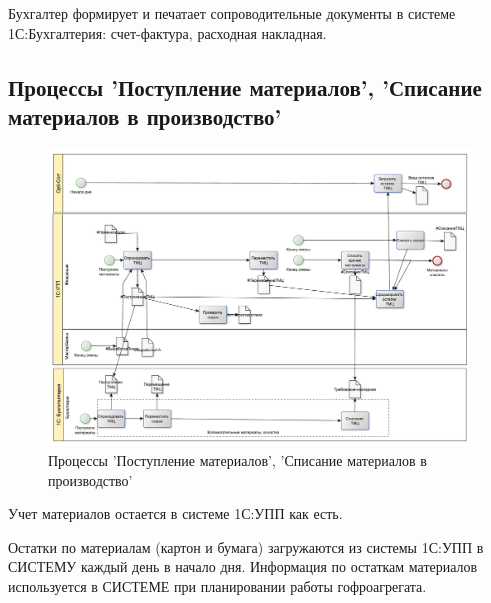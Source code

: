 Бухгалтер формирует и печатает сопроводительные документы в системе 1С:Бухгалтерия: счет-фактура, расходная накладная.



\subsection{Процессы 'Поступление материалов', 'Списание материалов в производство'}
%
\begin{figure}
\begin{center}
  \includegraphics[angle=90, height=0.8\textheight, keepaspectratio]{Pics/6_Учет ТМЦ.pdf}
\end{center}
  \caption{Процессы 'Поступление материалов', 'Списание материалов в производство'}
  \label{pic:Schema_6}
\end{figure}

Учет материалов остается в системе 1С:УПП как есть.

Остатки по материалам (картон и бумага) загружаются из системы 1С:УПП в СИСТЕМУ каждый день в начало дня. Информация по остаткам материалов используется в СИСТЕМЕ при планировании работы гофроагрегата.



